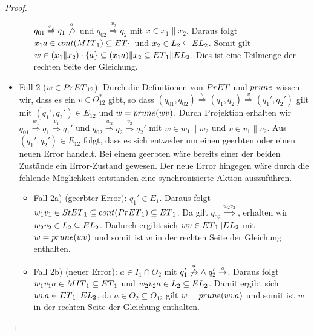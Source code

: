 \begin{proof}
\begin{itemize}
\begin{itemize}
      $q_{01}\overset{x_1}{\Rightarrow} q_1
      \overset{a}{\not{\hspace{-0.1cm}\rightarrow}}$ und
      $q_{02}\overset{x_2}{\Rightarrow} q_2$ mit $x\in x_1\|x_2$. Daraus folgt
      $x_1a\in cont{}(MIT{}_1)\subseteq ET{}_1$ und $x_2\in L_2\subseteq EL{}_2$. Somit
      gilt $w\in (x_1\| x_2)\cdot\{a\}\subseteq (x_1a)\|x_2\subseteq ET{}_1\|EL{}_2$.
      Dies ist eine Teilmenge der rechten Seite der Gleichung.
  \end{itemize}
    \item Fall 2 ($w\in PrET{}_{12}$): Durch die Definitionen von $PrET{}$
      und $prune{}$ wissen wir, dass es ein $v\in O_{12}^*$ gibt, so dass
      $(q_{01},q_{02}) \overset{w}{\Rightarrow} (q_1,q_2)
      \overset{v}{\Rightarrow} (q_1',q_2')$ gilt mit $(q_1',q_2')\in E_{12}$
      und $w=prune{}(wv)$. Durch Projektion erhalten wir $q_{01}
      \overset{w_1}{\Rightarrow} q_1 \overset{v_1}{\Rightarrow} q_1'$ und
      $q_{02} \overset{w_2}{\Rightarrow} q_2 \overset{v_2}{\Rightarrow} q_2'$
      mit $w\in w_1\|w_2$ und $v\in v_1\|v_2$. Aus $(q_1',q_2')\in E_{12}$
      folgt, dass es sich entweder um einen geerbten oder einen neuen Error
      handelt. Bei einem geerbten wäre bereits einer der beiden Zustände ein
      Error-Zustand gewesen. Der neue Error hingegen wäre durch die fehlende
      Möglichkeit entstanden eine synchronisierte Aktion auszuführen.
      \begin{itemize}
        \item Fall 2a) (geerbter Error): \OBdA{} $q_1'\in E_1$. Daraus folgt
          $w_1v_1\in StET{}_1\subseteq cont{}(PrET{}_1)\subseteq ET{}_1$. Da gilt
          $q_{02}\overset{w_2v_2}{\Rightarrow}$, erhalten wir $w_2v_2\in
          L_2\subseteq EL{}_2$. Dadurch ergibt sich $wv\in ET{}_1\|EL{}_2$ mit
          $w=prune{}(wv)$ und somit ist $w$ in der rechten Seite der Gleichung
          enthalten.
        \item Fall 2b) (neuer Error): \OBdA{} $a\in I_1\cap O_2$ mit
          $q_1'\overset{a}{\not{\hspace{-0.1cm}\rightarrow}} \wedge \; q_2'
          \overset{a}{\rightarrow}$. Daraus folgt $w_1v_1a\in MIT{}_1\subseteq
          ET{}_1$ und $w_2v_2a\in L_2\subseteq EL{}_2$. Damit ergibt sich $wva\in
          ET{}_1\|EL{}_2$, da $a\in O_2\subseteq O_{12}$ gilt $w=prune{}(wva)$ und
          somit ist $w$ in der rechten Seite der Gleichung enthalten.
      \end{itemize}
  \end{itemize}


\end{proof}
